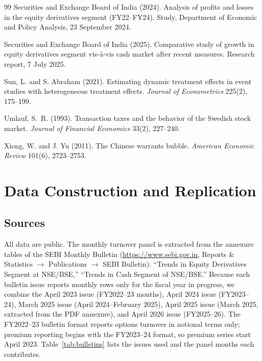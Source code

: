 \documentclass[12pt]{article}
\begin{document}
\begin{thebibliography}{99}
Securities and Exchange Board of India (2024).
Analysis of profits and losses in the equity derivatives segment
(FY22--FY24).
Study, Department of Economic and Policy Analysis, 23 September 2024.

Securities and Exchange Board of India (2025).
Comparative study of growth in equity derivatives segment vis-\`a-vis cash
market after recent measures.
Research report, 7 July 2025.

Sun, L. and S. Abraham (2021).
Estimating dynamic treatment effects in event studies with heterogeneous
treatment effects.
\emph{Journal of Econometrics} 225(2), 175--199.

Umlauf, S.~R. (1993).
Transaction taxes and the behavior of the Swedish stock market.
\emph{Journal of Financial Economics} 33(2), 227--240.

Xiong, W. and J. Yu (2011).
The Chinese warrants bubble.
\emph{American Economic Review} 101(6), 2723--2753.

\end{thebibliography}

\newpage
\appendix

\section{Data Construction and Replication}\label{app:data}

\subsection{Sources}

All data are public. The monthly turnover panel is extracted from the
annexure tables of the SEBI Monthly Bulletin
(\url{https://www.sebi.gov.in}, Reports \& Statistics $\rightarrow$
Publications $\rightarrow$ SEBI Bulletin): ``Trends in Equity Derivatives
Segment at NSE/BSE,'' ``Trends in Cash Segment of NSE/BSE.'' Because each
bulletin issue reports monthly rows only for the fiscal year in progress,
we combine the April 2023 issue (FY2022--23 months), April 2024 issue
(FY2023--24), March 2025 issue (April 2024--February 2025), April 2025
issue (March 2025, extracted from the PDF annexure), and April 2026 issue
(FY2025--26). The FY2022--23 bulletin format reports options turnover in
notional terms only; premium reporting begins with the FY2023--24 format,
so premium series start April 2023. Table~\ref{tab:bulletins} lists the
issues used and the panel months each contributes.
\end{document}
